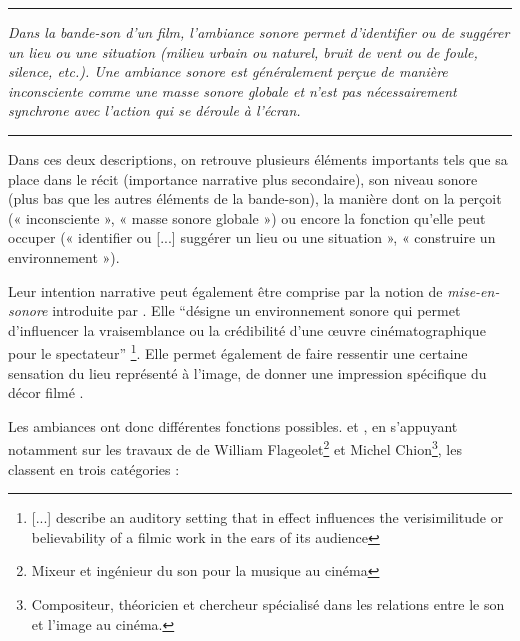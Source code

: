 ﻿\documentclass[12pt]{article}
\newcommand{\citationpropre}[3]{
\vspace{1.7em}
\hrule
\vspace{0.8em}

\textit{#1}

\hfill \parencite[#2]{#3}

\vspace{0.6em}
\hrule
\vspace{1.7em}
}
\begin{document}
\citationpropre{Dans la bande-son d'un film, l'ambiance sonore permet d'identifier ou de suggérer un lieu ou une situation (milieu urbain ou naturel, bruit de vent ou de foule, silence, etc.). Une ambiance sonore est généralement perçue de manière inconsciente comme une masse sonore globale et n'est pas nécessairement synchrone avec l'action qui se déroule à l'écran.}{}{de_nanteuil_dictionnaire_2008}

Dans ces deux descriptions, on retrouve plusieurs éléments importants tels que sa place dans le récit (importance narrative plus secondaire), son niveau sonore (plus bas que les autres éléments de la bande-son), la manière dont on la perçoit (« inconsciente », « masse sonore globale ») ou encore la fonction qu'elle peut occuper (« identifier ou [...] suggérer un lieu ou une situation », « construire un environnement »).

Leur intention narrative peut également être comprise par la notion de \textit{mise-en-sonore} introduite par \textcite{chattopadhyay_auditory_2021}. Elle \enquote{désigne un environnement sonore qui permet d'influencer la vraisemblance ou la crédibilité d'une œuvre cinématographique pour le spectateur} \footnote{[...] describe an auditory setting that in effect influences the verisimilitude or believability of a filmic work in the ears of its audience}. Elle permet également de faire ressentir une certaine sensation du lieu représenté à l'image, de donner une impression spécifique du décor filmé \parencite{chattopadhyay_auditory_2021}.

Les ambiances ont donc différentes fonctions possibles. \textcite{denizart_lemergence_2017} et \textcite{adjiman_qualifier_2015}, en s'appuyant notamment sur les travaux de de William Flageolet\footnote{Mixeur et ingénieur du son pour la musique au cinéma} et Michel Chion\footnote{Compositeur, théoricien et chercheur spécialisé dans les relations entre le son et l'image au cinéma.}, les classent en trois catégories :
\vspace{1em}
\end{document}
